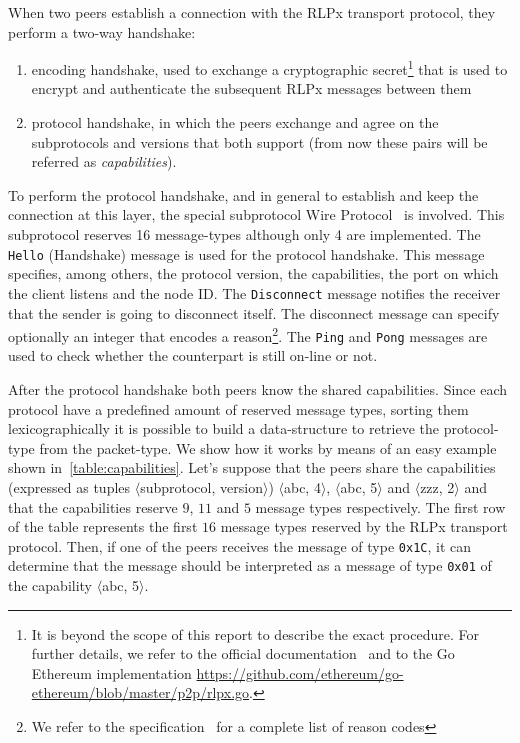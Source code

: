 When two peers establish a connection with the RLPx transport protocol, they
perform a two-way handshake:
\begin{enumerate}
  \item encoding handshake, used to exchange a cryptographic secret\footnote{It
  is beyond the scope of this report to describe the exact procedure. For
  further details, we refer to the official documentation~\cite{rlpx} and to the
  Go Ethereum implementation
  \url{https://github.com/ethereum/go-ethereum/blob/master/p2p/rlpx.go}.}
  that is used to encrypt and authenticate the subsequent RLPx messages between
  them
  \item protocol handshake, in which the peers exchange and agree on the
  subprotocols and versions that both support (from now these pairs will be
  referred as \emph{capabilities}).
\end{enumerate}

To perform the protocol handshake, and in general to establish and keep the
connection at this layer, the special subprotocol \devpp{} Wire
Protocol~\cite{devp2pwire} is involved. This subprotocol reserves 16
message-types although only 4 are implemented. The \verb+Hello+ (Handshake)
message is used for the protocol handshake. This message specifies, among
others, the protocol version, the capabilities, the port on which the client 
listens and the node ID. The \verb+Disconnect+ message notifies the receiver 
that the sender is going to disconnect itself. The disconnect message can 
specify optionally an integer that encodes a reason\footnote{We refer to the 
\devpp{} specification~\cite{devp2pwire} for a complete list of reason codes}. 
The \verb+Ping+ and \verb+Pong+ messages are used to check whether the 
counterpart is still on-line or not.

After the protocol handshake both peers know the shared capabilities. Since each
protocol have a predefined amount of reserved message types, sorting them
lexicographically it is possible to build a data-structure to retrieve the
protocol-type from the packet-type. We show how it works by means of an easy
example shown in~\autoref{table:capabilities}. Let's suppose that the peers
share the capabilities (expressed as tuples $\langle$subprotocol,
version$\rangle$) $\langle$abc, 4$\rangle$, $\langle$abc, 5$\rangle$ and
$\langle$zzz, 2$\rangle$ and that the capabilities reserve $9$, $11$ and $5$
message types respectively. The first row of the table represents the first $16$
message types reserved by the RLPx transport protocol. Then, if one of the peers
receives the message of type \texttt{0x1C}, it can determine that the message
should be interpreted as a message of type \texttt{0x01} of the capability
$\langle$abc, 5$\rangle$.

